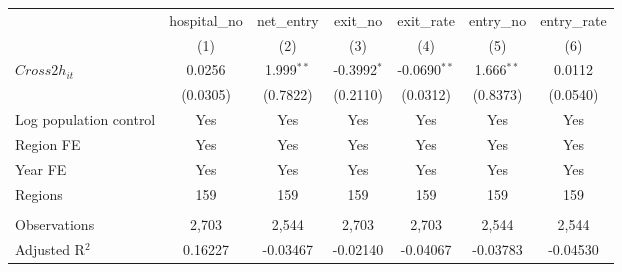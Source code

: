 \begingroup
\centering
\begin{tabular}{lcccccc}
   \toprule
                          & hospital\_no  & net\_entry   & exit\_no      & exit\_rate     & entry\_no    & entry\_rate \\    
                          & (1)           & (2)          & (3)           & (4)            & (5)          & (6)\\  
   \midrule 
   $Cross2h_{it}$         & 0.0256        & 1.999$^{**}$ & -0.3992$^{*}$ & -0.0690$^{**}$ & 1.666$^{**}$ & 0.0112\\   
                          & (0.0305)      & (0.7822)     & (0.2110)      & (0.0312)       & (0.8373)     & (0.0540)\\   
   Log population control & Yes           & Yes          & Yes           & Yes            & Yes          & Yes\\  
   Region FE              & Yes           & Yes          & Yes           & Yes            & Yes          & Yes\\  
   Year FE                & Yes           & Yes          & Yes           & Yes            & Yes          & Yes\\  
   Regions                & 159           & 159          & 159           & 159            & 159          & 159\\  
    \\
   Observations           & 2,703         & 2,544        & 2,703         & 2,703          & 2,544        & 2,544\\  
   Adjusted R$^2$         & 0.16227       & -0.03467     & -0.02140      & -0.04067       & -0.03783     & -0.04530\\  
   \bottomrule
\end{tabular}
\par\endgroup
